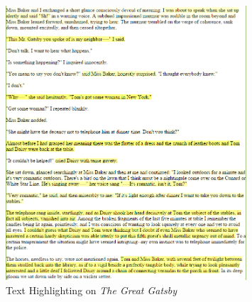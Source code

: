 \documentclass[twoside]{article}
\begin{document}
\begin{figure}
\begin{center}
  \includegraphics[width=0.8\textwidth]{img/highlight}
  \caption{Text Highlighting on \emph{The Great Gatsby}\label{figure:highlight}}
\end{center}
\end{figure}
\end{document}
